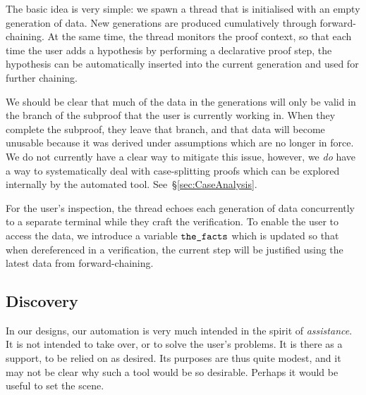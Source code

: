 The basic idea is very simple: we spawn a thread that is initialised with an empty generation of data. New generations are produced cumulatively through forward-chaining. At the same time, the thread monitors the proof context, so that each time the user adds a hypothesis by performing a declarative proof step, the hypothesis can be automatically inserted into the current generation and used for further chaining.

We should be clear that much of the data in the generations will only be valid in the branch of the subproof that the user is currently working in. When they complete the subproof, they leave that branch, and that data will become unusable because it was derived under assumptions which are no longer in force. We do not currently have a clear way to mitigate this issue, however, we \emph{do} have a way to systematically deal with case-splitting proofs which can be explored internally by the automated tool. See~\S\ref{sec:CaseAnalysis}.

For the user's inspection, the thread echoes each generation of data concurrently to a separate terminal while they craft the verification. To enable the user to access the data, we introduce a variable $\texttt{the\_facts}$ which is updated so that when dereferenced in a verification, the current step will be justified using the latest data from forward-chaining.



\subsection{Discovery}
In our designs, our automation is very much intended in the spirit of \emph{assistance}. It is not intended to take over, or to solve the user's problems. It is there as a support, to be relied on as desired. Its purposes are thus quite modest, and it may not be clear why such a tool would be so desirable. Perhaps it would be useful to set the scene.

